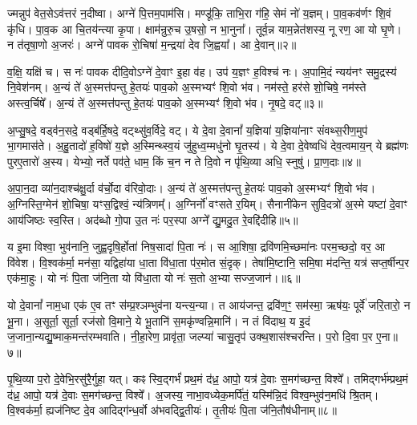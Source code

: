 ज्मन्नुप॑ वेत॒से\-ऽव॑त्तरं न॒दीष्वा। अग्ने॑ पि॒त्तम॒पाम॑सि। मण्डू॑कि॒ ताभि॒रा ग॑हि॒ सेमं नो॑ य॒ज्ञम्। पा॒व॒कव॑र्णꣳ शि॒वं कृ॑धि। पा॒व॒क आ चि॒तय॑न्त्या कृ॒पा। क्षाम॑न्रुरु॒च उ॒षसो॒ न भा॒नुना᳚। तूर्व॒न्न याम॒न्नेत॑शस्य॒ नू रण॒ आ यो घृ॒णे। न त॑तृषा॒णो अ॒जरः॑। अग्ने॑ पावक रो॒चिषा॑ म॒न्द्रया॑ देव जि॒ह्वया᳚। आ दे॒वान्॥२॥

व॒क्षि॒ यक्षि॑ च। स नः॑ पावक दीदि॒वो\-ऽग्ने॑ दे॒वाꣳ इ॒हा व॑ह। उप॑ य॒ज्ञꣳ ह॒विश्च॑ नः। अ॒पामि॒दं न्यय॑नꣳ समु॒द्रस्य॑ नि॒वेश॑नम्। अ॒न्यं ते॑ अ॒स्मत्त॑पन्तु हे॒तयः॑ पाव॒को अ॒स्मभ्यꣳ॑ शि॒वो भ॑व। नम॑स्ते॒ हर॑से शो॒चिषे॒ नम॑स्ते अस्त्व॒र्चिषे᳚। अ॒न्यं ते॑ अ॒स्मत्त॑पन्तु हे॒तयः॑ पाव॒को अ॒स्मभ्यꣳ॑ शि॒वो भ॑व। नृ॒षदे॒ वट्॥३॥

अ॒प्सु॒षदे॒ वड्व॑न॒सदे॒ वड्ब॑र्\mbox{}हि॒षदे॒ वट्थ्सु॑व॒र्विदे॒ वट्। ये दे॒वा दे॒वानां᳚ य॒ज्ञिया॑ य॒ज्ञिया॑नाꣳ संवथ्स॒रीण॒मुप॑ भा॒गमास॑ते। अ॒हु॒तादो॑ ह॒विषो॑ य॒ज्ञे अ॒स्मिन्थ्स्व॒यं जु॑हुध्व॒म्मधु॑नो घृ॒तस्य॑। ये दे॒वा दे॒वेष्वधि॑ देव॒त्वमाय॒न् ये ब्रह्म॑णः पुरए॒तारो॑ अ॒स्य। येभ्यो॒ नर्ते पव॑ते॒ धाम॒ किं च॒न न ते दि॒वो न पृ॑थि॒व्या अधि॒ स्नुषु॑। प्रा॒ण॒दाः॥४॥

अ॒पा॒न॒दा व्या॑न॒दाश्च॑क्षु॒र्दा व॑र्चो॒दा व॑रिवो॒दाः। अ॒न्यं ते॑ अ॒स्मत्त॑पन्तु हे॒तयः॑ पाव॒को अ॒स्मभ्यꣳ॑ शि॒वो भ॑व। अ॒ग्निस्ति॒ग्मेन॑ शो॒चिषा॒ यꣳस॒द्विश्वं॒ न्य॑त्रिणम्᳚। अ॒ग्निर्नो॑ वꣳसते र॒यिम्। सैनानी॑केन सुवि॒दत्रो॑ अ॒स्मे यष्टा॑ दे॒वाꣳ आय॑जिष्ठः स्व॒स्ति। अद॑ब्धो गो॒पा उ॒त नः॑ पर॒स्पा अग्ने᳚ द्यु॒मदु॒त रे॒वद्दि॑दीहि॥५॥

{\anuvakamend[{उप॑ दे॒वान् वट्प्रा॑ण॒दाश्चतु॑श्चत्वारिꣳशच्च॥१॥}]}

य इ॒मा विश्वा॒ भुव॑नानि॒ जुह्व॒दृषि॒र्\mbox{}होता॑ निष॒सादा॑ पि॒ता नः॑। स आ॒शिषा॒ द्रवि॑णमि॒च्छमा॑नः परम॒च्छदो॒ वर॒ आ वि॑वेश। वि॒श्वक॑र्मा॒ मन॑सा॒ यद्विहा॑या धा॒ता वि॑धा॒ता प॑र॒मोत सं॒दृक्। तेषा॑मि॒ष्टानि॒ समि॒षा म॑दन्ति॒ यत्र॑ सप्त॒र्\mbox{}षीन्प॒र एक॑मा॒हुः। यो नः॑ पि॒ता ज॑नि॒ता यो वि॑धा॒ता यो नः॑ स॒तो अ॒भ्या सज्ज॒जान॑।॥६॥

यो दे॒वानां᳚ नाम॒धा एक॑ ए॒व तꣳ स॑म्प्र॒श्ञम्भुव॑ना यन्त्य॒न्या। त आय॑जन्त॒ द्रवि॑ण॒ꣳ॒ सम॑स्मा॒ ऋष॑यः॒ पूर्वे॑ जरि॒तारो॒ न भू॒ना। अ॒सूर्ता॒ सूर्ता॒ रज॑सो वि॒माने॒ ये भू॒तानि॑ स॒मकृ॑ण्वन्नि॒मानि॑। न तं वि॑दाथ॒ य इ॒दं ज॒जाना॒न्यद्यु॒ष्माक॒मन्त॑रम्भवाति। नी॒हा॒रेण॒ प्रावृ॑ता॒ जल्प्या॑ चासु॒तृप॑ उक्थ॒शास॑श्चरन्ति। प॒रो दि॒वा प॒र ए॒ना॥७॥

पृ॒थि॒व्या प॒रो दे॒वेभि॒रसु॑रै॒र्गुहा॒ यत्। कꣴ स्वि॒द्गर्भं॑ प्रथ॒मं द॑ध्र॒ आपो॒ यत्र॑ दे॒वाः स॒मग॑च्छन्त॒ विश्वे᳚। तमिद्गर्भ॑म्प्रथ॒मं द॑ध्र॒ आपो॒ यत्र॑ दे॒वाः स॒मग॑च्छन्त॒ विश्वे᳚। अ॒जस्य॒ नाभा॒वध्येक॒मर्पि॑तं॒ यस्मि॑न्नि॒दं विश्व॒म्भुव॑न॒\-मधि॑ श्रि॒तम्। वि॒श्वक॑र्मा॒ ह्यज॑निष्ट दे॒व आदिद्ग॑न्ध॒र्वो अ॑भवद्द्वि॒तीयः॑। तृ॒तीयः॑ पि॒ता ज॑नि॒तौष॑धीनाम्॥८॥

